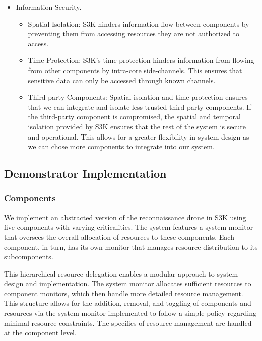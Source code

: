 \begin{itemize}
\begin{itemize}
		\end{itemize}
	\item Information Security.
		\begin{itemize}
			\item Spatial Isolation: 
				S3K hinders information flow between components by preventing them from accessing resources they are not authorized to access.
			\item Time Protection:
				S3K's time protection hinders information from flowing from other components by intra-core side-channels.
				This ensures that sensitive data can only be accessed through known channels.
			\item Third-party Components:
				Spatial isolation and time protection ensures that we can integrate and isolate less trusted third-party components.
				If the third-party component is compromised, the spatial and temporal isolation provided by S3K ensures that the rest of the system is secure and operational.
				This allows for a greater flexibility in system design as we can chose more components to integrate into our system.
		\end{itemize}
\end{itemize}

\subsection{Demonstrator Implementation}

\subsubsection{Components}

We implement an abstracted version of the reconnaissance drone in S3K using five components with varying criticalities. 
The system features a system monitor that oversees the overall allocation of resources to these components. 
Each component, in turn, has its own monitor that manages resource distribution to its subcomponents.

This hierarchical resource delegation enables a modular approach to system design and implementation. 
The system monitor allocates sufficient resources to component monitors, which then handle more detailed resource management. 
This structure allows for the addition, removal, and toggling of components and resources via the system monitor implemented to follow a simple policy regarding minimal resource constraints. 
The specifics of resource management are handled at the component level.

